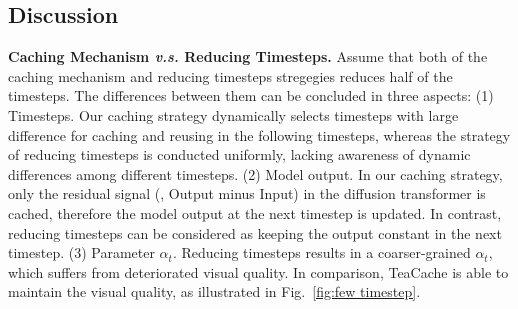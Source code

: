 \subsection{Discussion}
\textbf{Caching Mechanism \textit{v.s.} Reducing Timesteps.} 
Assume that both of the caching mechanism and reducing timesteps stregegies reduces half of the timesteps. The differences between them can be concluded in three aspects: 
(1) Timesteps. Our caching strategy dynamically selects timesteps with large difference for caching and reusing in the following timesteps, whereas the strategy of reducing timesteps is conducted uniformly, lacking awareness of dynamic differences among different timesteps. 
(2) Model output. In our caching strategy, only the residual signal (\ie, Output minus Input) in the diffusion transformer is cached, therefore the model output at the next timestep is updated. In contrast, reducing timesteps can be considered as keeping the output constant in the next timestep.
(3) Parameter $\alpha_t$. Reducing timesteps results in a coarser-grained $\alpha_t$, which suffers from deteriorated visual quality. In comparison, TeaCache is able to maintain the visual quality, as illustrated in Fig.~\ref{fig:few timestep}.


